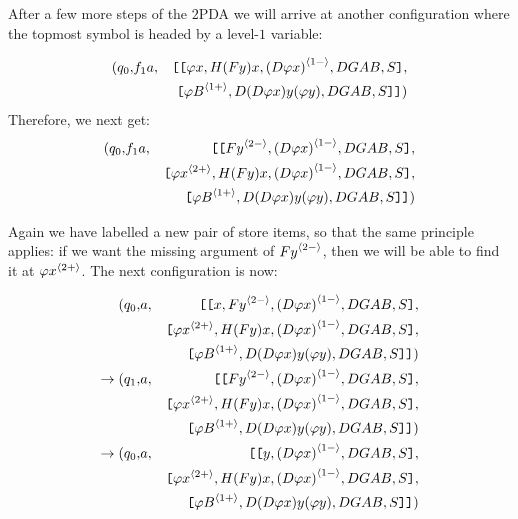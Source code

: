 After a few more steps of the $2$PDA we will arrive at another
configuration where the topmost symbol is headed by a level-$1$
variable:

\begin{eqnarray}
\nonumber (q_0, & f_1a, & \hbox{\tt [}\hbox{\tt [}{\varphi x,H (F y) x,{(D
\varphi x)}^{\langle{1-}\rangle}, DGAB, S}\hbox{\tt ]}, \\
\nonumber & &\hbox{\tt [}{{\varphi B}^{\langle{1+}\rangle}, D (D \varphi x) y (\varphi
y), DGAB,S}\hbox{\tt ]}\hbox{\tt ]})
\end{eqnarray}
Therefore, we next get:
\begin{eqnarray}
\nonumber (q_0, & f_1a, &  \hbox{\tt [}\hbox{\tt [}{{F y}^{\langle{2-}\rangle}, {(D
\varphi x)}^{\langle{1-}\rangle}, DGAB, S}\hbox{\tt ]},\\
\nonumber  & &\hbox{\tt [}{{\varphi x}^{\langle{2+}\rangle},H (F y) x,{(D \varphi x)}^{\langle{1-}\rangle}, DGAB, S}\hbox{\tt ]},\\
\nonumber & &\hbox{\tt [}{{\varphi B}^{\langle{1+}\rangle}, D (D \varphi x) y (\varphi
y), DGAB,S}\hbox{\tt ]}\hbox{\tt ]})
\end{eqnarray}

Again we have labelled a new pair of store items, so that the same
principle applies: if we want the missing argument of ${F
y}^{\langle{2-}\rangle}$, then we will be able to find it at ${\varphi
x}^{\langle{2+}\rangle}$. The next configuration is now:

\begin{eqnarray}
\nonumber (q_0, & a, &  \hbox{\tt [}\hbox{\tt [}{x,{F y}^{\langle{2-}\rangle}, {(D \varphi
x)}^{\langle{1-}\rangle}, DGAB, S}\hbox{\tt ]}, \\
\nonumber & & \hbox{\tt [}{{\varphi x}^{\langle{2+}\rangle},H (F y) x,{(D \varphi x)}^{\langle{1-}\rangle}, DGAB, S}\hbox{\tt ]},\\
\nonumber & & \hbox{\tt [}{{\varphi B}^{\langle{1+}\rangle}, D (D \varphi x) y (\varphi
y), DGAB,S}\hbox{\tt ]}\hbox{\tt ]})\\
\nonumber \rightarrow (q_1, & a, &  \hbox{\tt [}\hbox{\tt [}{{F y}^{\langle{2-}\rangle}, {(D \varphi
x)}^{\langle{1-}\rangle}, DGAB, S}\hbox{\tt ]}, \\
\nonumber & & \hbox{\tt [}{{\varphi x}^{\langle{2+}\rangle},H (F y) x,{(D \varphi x)}^{\langle{1-}\rangle}, DGAB, S}\hbox{\tt ]},\\
\nonumber & & \hbox{\tt [}{{\varphi B}^{\langle{1+}\rangle}, D (D \varphi x) y (\varphi
y), DGAB,S}\hbox{\tt ]}\hbox{\tt ]})\\
\nonumber \rightarrow (q_0, & a, &  \hbox{\tt [}\hbox{\tt [}{y, {(D \varphi
x)}^{\langle{1-}\rangle}, DGAB, S}\hbox{\tt ]}, \\
\nonumber & & \hbox{\tt [}{{\varphi x}^{\langle{2+}\rangle},H (F y) x,{(D \varphi x)}^{\langle{1-}\rangle}, DGAB, S}\hbox{\tt ]},\\
\nonumber & & \hbox{\tt [}{{\varphi B}^{\langle{1+}\rangle}, D (D \varphi x) y (\varphi
y), DGAB,S}\hbox{\tt ]}\hbox{\tt ]})
\end{eqnarray}

